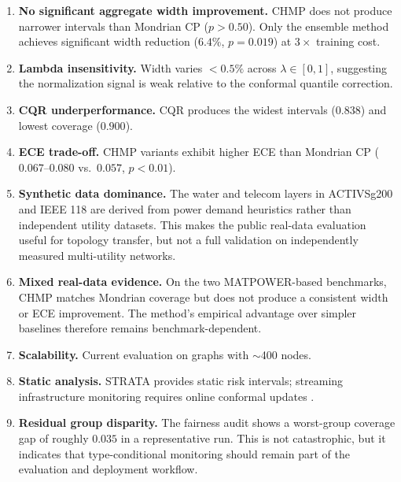 \documentclass[twoside,11pt]{article}
\begin{document}
\begin{enumerate}
\item \textbf{No significant aggregate width improvement.} CHMP does not
produce narrower intervals than Mondrian CP ($p > 0.50$). Only the ensemble
method achieves significant width reduction ($6.4\%$, $p = 0.019$) at
$3\times$ training cost.

\item \textbf{Lambda insensitivity.} Width varies $<0.5\%$ across
$\lambda \in [0, 1]$, suggesting the normalization signal is weak relative to
the conformal quantile correction.

\item \textbf{CQR underperformance.} CQR produces the widest intervals
($0.838$) and lowest coverage ($0.900$).

\item \textbf{ECE trade-off.} CHMP variants exhibit higher ECE than Mondrian
CP ($0.067$--$0.080$ vs.\ $0.057$, $p < 0.01$).

\item \textbf{Synthetic data dominance.} The water and telecom layers in
ACTIVSg200 and IEEE 118 are derived from power demand heuristics rather than
independent utility datasets. This makes the public real-data evaluation useful
for topology transfer, but not a full validation on independently measured
multi-utility networks.

\item \textbf{Mixed real-data evidence.} On the two MATPOWER-based benchmarks,
CHMP matches Mondrian coverage but does not produce a consistent width or ECE
improvement. The method's empirical advantage over simpler baselines therefore
remains benchmark-dependent.

\item \textbf{Scalability.} Current evaluation on graphs with $\sim$400 nodes.

\item \textbf{Static analysis.} STRATA provides static risk intervals;
streaming infrastructure monitoring requires online conformal updates
\citep{gibbs2021adaptive}.

\item \textbf{Residual group disparity.} The fairness audit shows a worst-group
coverage gap of roughly $0.035$ in a representative run. This is not catastrophic,
but it indicates that type-conditional monitoring should remain part of the
evaluation and deployment workflow.
\end{enumerate}
\end{document}
